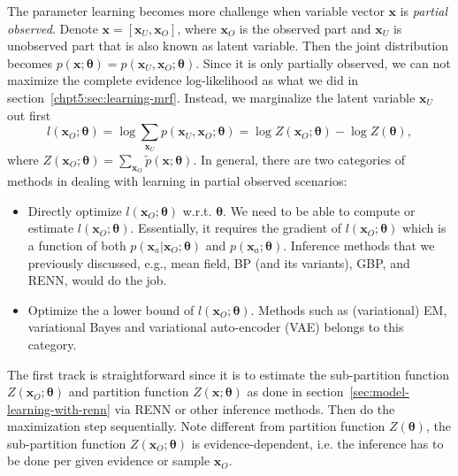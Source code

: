 The parameter learning becomes more challenge when variable vector $\bm{x}$ is \textit{partial observed}. Denote $\bm{x} = [\bm{x}_U, \bm{x}_O]$, where $\bm{x}_O$ is the observed part and $\bm{x}_U$ is unobserved part that is also known as latent variable. Then the joint distribution becomes $p(\bm{x}; \bm{\theta}) = p(\bm{x}_U, \bm{x}_O; \bm{\theta})$. Since it is only partially observed, we can not maximize the complete evidence log-likelihood as what we did in section~\ref{chpt5:sec:learning-mrf}. Instead, we marginalize the latent variable $\bm{x}_U$ out first
\begin{equation}\label{chpt2:eq:patial-likelihood}
  l(\bm{x}_O; \bm{\theta}) = \log{\sum_{\bm{x}_U}p(\bm{x}_U, \bm{x}_O; \bm{\theta})} = \log{Z(\bm{x}_O;\bm{\theta})} - \log{Z(\bm{\theta})},
\end{equation}
where $Z(\bm{x}_O;\bm{\theta}) = \sum_{\bm{x}_O}\tilde{p}(\bm{x}; \bm{\theta})$. In general, there are two categories of methods in dealing with learning in partial observed scenarios:
\begin{itemize}
\item Directly optimize $l(\bm{x}_O; \bm{\theta})$ w.r.t. $\bm{\theta}$. We need to be able to compute or estimate $l(\bm{x}_O; \bm{\theta})$. Essentially, it requires the gradient of $l(\bm{x}_O; \bm{\theta})$ which is a function of both $p(\bm{x}_a| \bm{x}_O; \bm{\theta})$ and $p(\bm{x}_a; \bm{\theta})$. Inference methods that we previously discussed, e.g., mean field, BP (and its variants), GBP, and RENN, would do the job.
\item Optimize the a lower bound of $l(\bm{x}_O; \bm{\theta})$. Methods such as (variational) EM, variational Bayes and variational auto-encoder (VAE) \cite{kingma2019vae} belongs to this category.
\end{itemize}

The first track is straightforward since it is to estimate the sub-partition function $Z(\bm{x}_O; \bm{\theta})$ and partition function $Z(\bm{x}; \bm{\theta})$ as done in section~\ref{sec:model-learning-with-renn} via RENN or other inference methods. Then do the maximization step sequentially. Note different from partition function $Z(\bm{\theta})$, the sub-partition function $Z(\bm{x}_O; \bm{\theta})$ is evidence-dependent, i.e. the inference has to be done per given evidence or sample  $\bm{x}_O$. 

